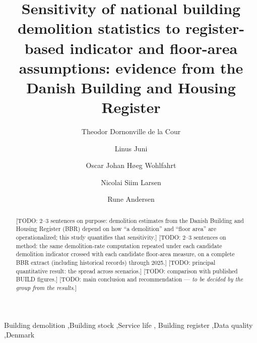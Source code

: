 \documentclass[preprint,12pt]{elsarticle}
\begin{document}
\begin{frontmatter}

\title{Sensitivity of national building demolition statistics to
       register-based indicator and floor-area assumptions:
       evidence from the Danish Building and Housing Register}

\author[dtu]{Theodor Dornonville de la Cour}
\author[dtu]{Linus Juni}
\author[dtu]{Oscar Johan H{\o}eg Wohlfahrt}
\author[dtu]{Nicolai Siim Larsen}
\author[dtu]{Rune Andersen}


\begin{abstract}
[TODO: 2--3 sentences on purpose: demolition estimates from the Danish
Building and Housing Register (BBR) depend on how ``a demolition'' and
``floor area'' are operationalized; this study quantifies that
sensitivity.]
[TODO: 2--3 sentences on method: the same demolition-rate computation
repeated under each candidate demolition indicator crossed with each
candidate floor-area measure, on a complete BBR extract (including
historical records) through 2025.]
[TODO: principal quantitative result: the spread across scenarios.]
[TODO: comparison with published BUILD figures.]
[TODO: main conclusion and recommendation --- \emph{to be decided by the
group from the results}.]
\end{abstract}

\begin{keyword}
Building demolition \sep Building stock \sep Service life \sep
Building register \sep Data quality \sep Denmark
\end{keyword}

\end{frontmatter}
\end{document}
